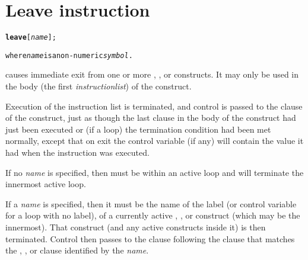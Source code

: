 \section{Leave instruction}\label{refleave}
\index{,}
\begin{shaded}
\begin{alltt}
\textbf{leave} [\emph{name}];

where \emph{name} is a non-numeric \emph{symbol}.
\end{alltt}
\end{shaded}
  causes immediate exit from one or more ,
, or  constructs.
It may only be used in the body (the first \emph{instructionlist})
of the construct.
 
Execution of the instruction list is terminated, and control is
passed to the  clause of the construct, just as though the
last clause in the body of the construct had just been executed or (if
a loop) the termination condition had been met normally, except that on
exit the control variable (if any) will contain the value it had when
the  instruction was executed.
 
If no \emph{name} is specified, then  must be
within an active loop and will terminate the innermost active loop.
 
If a \emph{name} is specified, then it must be the name of the
label (or control variable for a loop with no label), of a currently
active , , or  construct
(which may be the innermost).  That construct (and any active constructs
inside it) is then terminated.  Control then passes to the clause
following the  clause that matches the
, , or  clause identified by the
\emph{name}.

